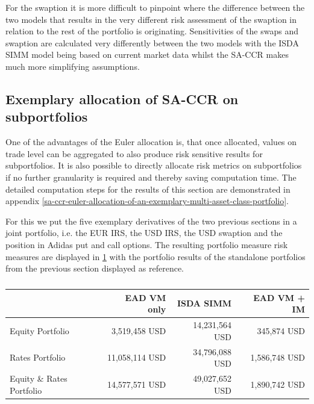 \documentclass[../Thesis_AHoecherl.tex]{subfiles}
\begin{document}
    For the swaption it is more difficult to pinpoint where the difference between the two models that results in the very different risk assessment of the swaption in relation to the rest of the portfolio is originating.
    Sensitivities of the swaps and swaption are calculated very differently between the two models with the ISDA SIMM model being based on current market data whilst the SA-CCR makes much more simplifying assumptions.

    \subsection{Exemplary allocation of SA-CCR on subportfolios}

    One of the advantages of the Euler allocation is, that once allocated, values on trade level can be aggregated to also produce risk sensitive results for subportfolios. It is also possible to directly allocate risk metrics on subportfolios if no further granularity is required and thereby saving computation time. The detailed computation steps for the results of this section are demonstrated in appendix \ref{sa-ccr-euler-allocation-of-an-exemplary-multi-asset-class-portfolio}.

    For this we put the five exemplary derivatives of the two previous sections in a joint portfolio, i.e. the EUR IRS, the USD IRS, the USD swaption and the position in Adidas put and call options.
    The resulting portfolio measure risk measures are displayed in \ref{tab:multiAssetResult} with the portfolio results of the standalone portfolios from the previous section displayed as reference.

    \begin{table}[htbp]
        \centering
        \begin{tabular}{l||r|r|r}
                & EAD VM only &ISDA SIMM & EAD VM + IM \\
                \toprule
        Equity Portfolio & 3,519,458 USD & 14,231,564 USD & 345,874 USD \\
        Rates Portfolio & 11,058,114 USD & 34,796,088 USD & 1,586,748 USD \\
        \midrule
        Equity \& Rates Portfolio & 14,577,571 USD & 49,027,652  USD & 1,890,742 USD \\
        \end{tabular}%
        \caption{}
        \label{tab:multiAssetResult}%
    \end{table}%
\end{document}
